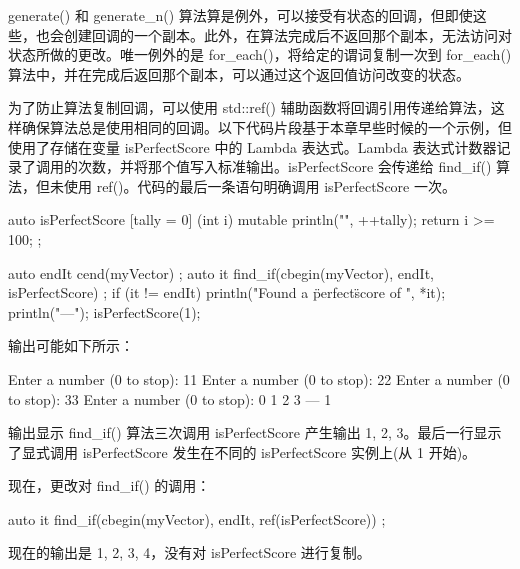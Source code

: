 generate() 和 generate\_n() 算法算是例外，可以接受有状态的回调，但即使这些，也会创建回调的一个副本。此外，在算法完成后不返回那个副本，无法访问对状态所做的更改。唯一例外的是 for\_each()，将给定的谓词复制一次到 for\_each() 算法中，并在完成后返回那个副本，可以通过这个返回值访问改变的状态。

为了防止算法复制回调，可以使用 std::ref() 辅助函数将回调引用传递给算法，这样确保算法总是使用相同的回调。以下代码片段基于本章早些时候的一个示例，但使用了存储在变量 isPerfectScore 中的 Lambda 表达式。Lambda 表达式计数器记录了调用的次数，并将那个值写入标准输出。isPerfectScore 会传递给 find\_if() 算法，但未使用 ref()。代码的最后一条语句明确调用 isPerfectScore 一次。

\begin{cpp}
auto isPerfectScore { [tally = 0] (int i) mutable {
        println("{}", ++tally); return i >= 100; } };

auto endIt { cend(myVector) };
auto it { find_if(cbegin(myVector), endIt, isPerfectScore) };
if (it != endIt) { println("Found a \"perfect\" score of {}", *it); }
println("---");
isPerfectScore(1);
\end{cpp}

输出可能如下所示：

\begin{shell}
Enter a number (0 to stop): 11
Enter a number (0 to stop): 22
Enter a number (0 to stop): 33
Enter a number (0 to stop): 0
1
2
3
---
1
\end{shell}

输出显示 find\_if() 算法三次调用 isPerfectScore 产生输出 1, 2, 3。最后一行显示了显式调用 isPerfectScore 发生在不同的 isPerfectScore 实例上(从 1 开始)。

现在，更改对 find\_if() 的调用：

\begin{cpp}
auto it { find_if(cbegin(myVector), endIt, ref(isPerfectScore)) };
\end{cpp}

现在的输出是 1, 2, 3, 4，没有对 isPerfectScore 进行复制。





